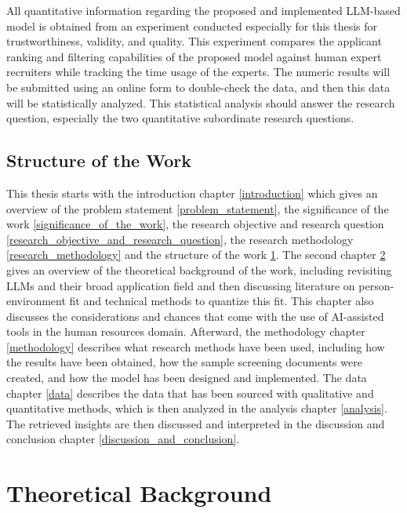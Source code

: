 \documentclass[draft,final]{thesisclass} %
\begin{document}
All quantitative information regarding the proposed and implemented \acs{LLM}-based model is obtained from an experiment conducted especially for this thesis for trustworthiness, validity, and quality.
This experiment compares the applicant ranking and filtering capabilities of the proposed model against human expert recruiters while tracking the time usage of the experts.
The numeric results will be submitted using an online form to double-check the data, and then this data will be statistically analyzed.
This statistical analysis should answer the research question, especially the two quantitative subordinate research questions.

\section{Structure of the Work} \label{structure_of_the_work}
This thesis starts with the introduction chapter \ref{introduction} which gives an overview of the problem statement \ref{problem_statement}, the significance of the work \ref{significance_of_the_work}, the research objective and research question \ref{research_objective_and_research_question}, the research methodology \ref{research_methodology} and the structure of the work \ref{structure_of_the_work}.
The second chapter \ref{theoretical_background} gives an overview of the theoretical background of the work, including revisiting \gls{LLM}s and their broad application field and then discussing literature on person-environment fit and technical methods to quantize this fit.
This chapter also discusses the considerations and chances that come with the use of \acs{AI}-assisted tools in the human resources domain.
Afterward, the methodology chapter \ref{methodology} describes what research methods have been used, including how the results have been obtained, how the sample screening documents were created, and how the model has been designed and implemented.
The data chapter \ref{data} describes the data that has been sourced with qualitative and quantitative methods, which is then analyzed in the analysis chapter \ref{analysis}.
The retrieved insights are then discussed and interpreted in the discussion and conclusion chapter \ref{discussion_and_conclusion}.
\chapter{Theoretical Background} \label{theoretical_background}
\end{document}

